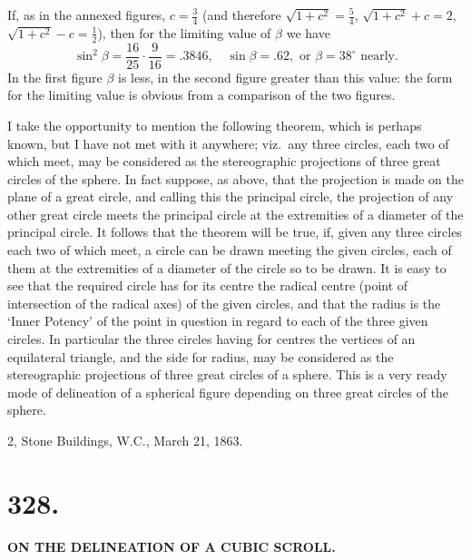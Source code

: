 \documentclass[11pt,a4paper]{article}
\begin{document}
If, as in the annexed figures, $c = \frac{3}{4}$ (and therefore $\sqrt{1+c^2} = \frac{5}{4}$, $\sqrt{1+c^2}+c = 2$, $\sqrt{1+c^2}-c = \frac{1}{2}$), then for the limiting value of $\beta$ we have
\[
\sin^2\beta = \frac{16}{25} \cdot \frac{9}{16} = .3846, \quad \sin\beta = .62, \text{ or } \beta = 38^\circ \text{ nearly}.
\]
In the first figure $\beta$ is less, in the second figure greater than this value: the form for the limiting value is obvious from a comparison of the two figures.

I take the opportunity to mention the following theorem, which is perhaps known, but I have not met with it anywhere; viz.\ any three circles, each two of which meet, may be considered as the stereographic projections of three great circles of the sphere. In fact suppose, as above, that the projection is made on the plane of a great circle, and calling this the principal circle, the projection of any other great circle meets the principal circle at the extremities of a diameter of the principal circle. It follows that the theorem will be true, if, given any three circles each two of which meet, a circle can be drawn meeting the given circles, each of them at the extremities of a diameter of the circle so to be drawn. It is easy to see that the required circle has for its centre the radical centre (point of intersection of the radical axes) of the given circles, and that the radius is the `Inner Potency' of the point in question in regard to each of the three given circles. In particular the three circles having for centres the vertices of an equilateral triangle, and the side for radius, may be considered as the stereographic projections of three great circles of a sphere. This is a very ready mode of delineation of a spherical figure depending on three great circles of the sphere.

\begin{flushright}
2, Stone Buildings, W.C., March 21, 1863.
\end{flushright}

\newpage
\section*{328.}

\begin{center}
\textbf{ON THE DELINEATION OF A CUBIC SCROLL.}
\end{center}
\end{document}
